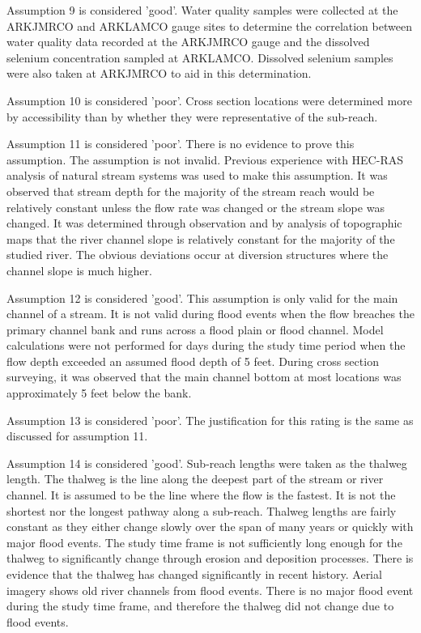 \begin{linenumbers}[1]
Assumption 9 is considered 'good'.  Water quality samples were collected at the ARKJMRCO and ARKLAMCO gauge sites to determine the correlation between water quality data recorded at the ARKJMRCO gauge and the dissolved selenium concentration sampled at ARKLAMCO.  Dissolved selenium samples were also taken at ARKJMRCO to aid in this determination.

Assumption 10 is considered 'poor'.  Cross section locations were determined more by accessibility than by whether they were representative of the sub-reach.

Assumption 11 is considered 'poor'.  There is no evidence to prove this assumption.  The assumption is not invalid.  Previous experience with HEC-RAS analysis of natural stream systems was used to make this assumption.  It was observed that stream depth for the majority of the stream reach would be relatively constant unless the flow rate was changed or the stream slope was changed.  It was determined through observation and by analysis of topographic maps that the river channel slope is relatively constant for the majority of the studied river.  The obvious deviations occur at diversion structures where the channel slope is much higher.

Assumption 12 is considered 'good'.  This assumption is only valid for the main channel of a stream.  It is not valid during flood events when the flow breaches the primary channel bank and runs across a flood plain or flood channel.  Model calculations were not performed for days during the study time period when the flow depth exceeded an assumed flood depth of 5 feet.  During cross section surveying, it was observed that the main channel bottom at most locations was approximately 5 feet below the bank.

Assumption 13 is considered 'poor'.  The justification for this rating is the same as discussed for assumption 11.

Assumption 14 is considered 'good'.  Sub-reach lengths were taken as the thalweg length.  The thalweg is the line along the deepest part of the stream or river channel.  It is assumed to be the line where the flow is the fastest.  It is not the shortest nor the longest pathway along a sub-reach.  Thalweg lengths are fairly constant as they either change slowly over the span of many years or quickly with major flood events.  The study time frame is not sufficiently long enough for the thalweg to significantly change through erosion and deposition processes.  There is evidence that the thalweg has changed significantly in recent history.  Aerial imagery shows old river channels from flood events.  There is no major flood event during the study time frame, and therefore the thalweg did not change due to flood events.


\end{linenumbers}
